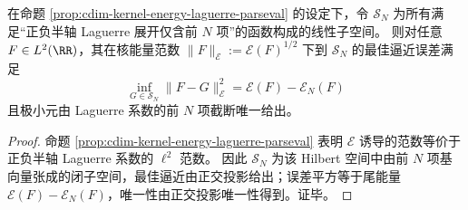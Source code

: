 \begin{proposition}\label{prop:cdim-kernel-energy-best-nterm}
在命题 \ref{prop:cdim-kernel-energy-laguerre-parseval} 的设定下，令 \(\mathcal S_N\) 为所有满足“正负半轴 Laguerre 展开仅含前 \(N\) 项”的函数构成的线性子空间。
则对任意 \(F\in L^2(\RR)\)，其在核能量范数 \(\|F\|_{\mathcal E}:=\mathcal E(F)^{1/2}\) 下到 \(\mathcal S_N\) 的最佳逼近误差满足
\[
\boxed{\;
\inf_{G\in\mathcal S_N}\|F-G\|_{\mathcal E}^{2}
=\mathcal E(F)-\mathcal E_N(F)\;}
\]
且极小元由 Laguerre 系数的前 \(N\) 项截断唯一给出。
\end{proposition}
\begin{proof}
命题 \ref{prop:cdim-kernel-energy-laguerre-parseval} 表明 \(\mathcal E\) 诱导的范数等价于正负半轴 Laguerre 系数的 \(\ell^2\) 范数。
因此 \(\mathcal S_N\) 为该 Hilbert 空间中由前 \(N\) 项基向量张成的闭子空间，最佳逼近由正交投影给出；误差平方等于尾能量 \(\mathcal E(F)-\mathcal E_N(F)\)，唯一性由正交投影唯一性得到。证毕。
\end{proof}



\endinput
